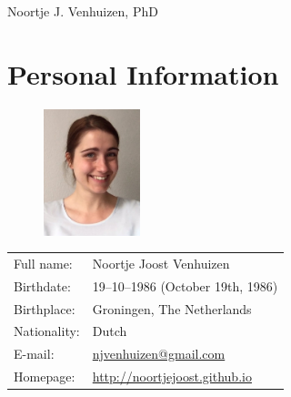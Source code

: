 \documentclass[a4paper,10pt]{article}
\def\leftcolwidth{.12\textwidth}
\begin{document}

\begin{flushright}
{\Huge Noortje J. Venhuizen, PhD}
\end{flushright}


\section*{Personal Information}

\begin{figure}
  \begin{flushright}
  \vspace*{-15pt}
  \includegraphics[width=0.25\textwidth]{noortje.jpg}
  \hspace*{7pt}
  \end{flushright}
\end{figure}

\noindent
\begin{tabularx}{\textwidth}{ p{\leftcolwidth} X }
  Full name:   &         Noortje Joost Venhuizen\\
  Birthdate:   &         19--10--1986 (October 19th, 1986)\\
  Birthplace:  &         Groningen, The Netherlands\\
  Nationality: &         Dutch\\
  E-mail:         
  &         \href{mailto:njvenhuizen@gmail.com}{njvenhuizen@gmail.com}\\
  Homepage:    &       \url{http://noortjejoost.github.io}
\end{tabularx}
\end{document}
